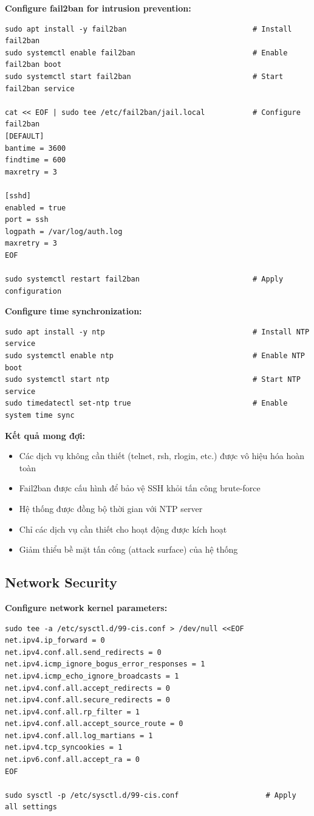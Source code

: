 \noindent \textbf{Configure fail2ban for intrusion prevention:}
\begin{verbatim}
sudo apt install -y fail2ban                             # Install fail2ban
sudo systemctl enable fail2ban                           # Enable fail2ban boot
sudo systemctl start fail2ban                            # Start fail2ban service

cat << EOF | sudo tee /etc/fail2ban/jail.local           # Configure fail2ban
[DEFAULT]
bantime = 3600
findtime = 600
maxretry = 3

[sshd]
enabled = true
port = ssh
logpath = /var/log/auth.log
maxretry = 3
EOF

sudo systemctl restart fail2ban                          # Apply configuration
\end{verbatim}

\noindent \textbf{Configure time synchronization:}
\begin{verbatim}
sudo apt install -y ntp                                  # Install NTP service
sudo systemctl enable ntp                                # Enable NTP boot
sudo systemctl start ntp                                 # Start NTP service
sudo timedatectl set-ntp true                            # Enable system time sync
\end{verbatim}

\noindent \textbf{Kết quả mong đợi:}
\begin{itemize}
\item Các dịch vụ không cần thiết (telnet, rsh, rlogin, etc.) được vô hiệu hóa hoàn toàn
\item Fail2ban được cấu hình để bảo vệ SSH khỏi tấn công brute-force
\item Hệ thống được đồng bộ thời gian với NTP server
\item Chỉ các dịch vụ cần thiết cho hoạt động được kích hoạt
\item Giảm thiểu bề mặt tấn công (attack surface) của hệ thống
\end{itemize}

\subsection{Network Security}

\noindent \textbf{Configure network kernel parameters:}
\begin{verbatim}
sudo tee -a /etc/sysctl.d/99-cis.conf > /dev/null <<EOF
net.ipv4.ip_forward = 0
net.ipv4.conf.all.send_redirects = 0
net.ipv4.icmp_ignore_bogus_error_responses = 1
net.ipv4.icmp_echo_ignore_broadcasts = 1
net.ipv4.conf.all.accept_redirects = 0
net.ipv4.conf.all.secure_redirects = 0
net.ipv4.conf.all.rp_filter = 1
net.ipv4.conf.all.accept_source_route = 0
net.ipv4.conf.all.log_martians = 1
net.ipv4.tcp_syncookies = 1
net.ipv6.conf.all.accept_ra = 0
EOF

sudo sysctl -p /etc/sysctl.d/99-cis.conf                    # Apply all settings
\end{verbatim}

